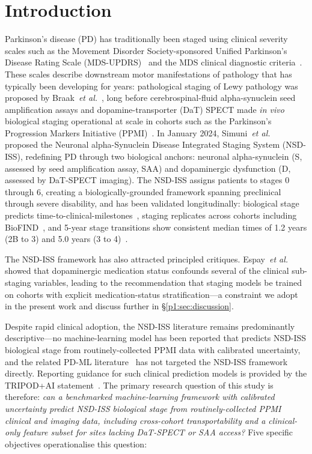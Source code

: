 \section{Introduction}
\label{p1:sec:introduction}

Parkinson's disease (PD) has traditionally been staged using clinical severity scales such as the Movement Disorder Society-sponsored Unified Parkinson's Disease Rating Scale (MDS-UPDRS)~\cite{goetz2008} and the MDS clinical diagnostic criteria~\cite{postuma2015}. These scales describe downstream motor manifestations of pathology that has typically been developing for years: pathological staging of Lewy pathology was proposed by Braak~\textit{et al.}~\cite{braak2003}, long before cerebrospinal-fluid alpha-synuclein seed amplification assays and dopamine-transporter (DaT) SPECT made \emph{in vivo} biological staging operational at scale in cohorts such as the Parkinson's Progression Markers Initiative (PPMI)~\cite{marek2018ppmi}. In January 2024, Simuni~\textit{et al.}~\cite{simuni2024} proposed the Neuronal alpha-Synuclein Disease Integrated Staging System (NSD-ISS), redefining PD through two biological anchors: neuronal alpha-synuclein (S, assessed by seed amplification assay, SAA) and dopaminergic dysfunction (D, assessed by DaT-SPECT imaging). The NSD-ISS assigns patients to stages 0 through 6, creating a biologically-grounded framework spanning preclinical through severe disability, and has been validated longitudinally: biological stage predicts time-to-clinical-milestones~\cite{simuni2024val}, staging replicates across cohorts including BioFIND~\cite{russo2025}, and 5-year stage transitions show consistent median times of 1.2 years (2B to 3) and 5.0 years (3 to 4)~\cite{simuni2025}.

The NSD-ISS framework has also attracted principled critiques. Espay~\textit{et al.}~\cite{espay2025med} showed that dopaminergic medication status confounds several of the clinical sub-staging variables, leading to the recommendation that staging models be trained on cohorts with explicit medication-status stratification---a constraint we adopt in the present work and discuss further in \S\ref{p1:sec:discussion}.

Despite rapid clinical adoption, the NSD-ISS literature remains predominantly descriptive---no machine-learning model has been reported that predicts NSD-ISS biological stage from routinely-collected PPMI data with calibrated uncertainty, and the related PD-ML literature~\cite{adamedgraph,diazrincon2025,rissanen2022} has not targeted the NSD-ISS framework directly. Reporting guidance for such clinical prediction models is provided by the TRIPOD+AI statement~\cite{collins2024}. The primary research question of this study is therefore: \emph{can a benchmarked machine-learning framework with calibrated uncertainty predict NSD-ISS biological stage from routinely-collected PPMI clinical and imaging data, including cross-cohort transportability and a clinical-only feature subset for sites lacking DaT-SPECT or SAA access?} Five specific objectives operationalise this question:

